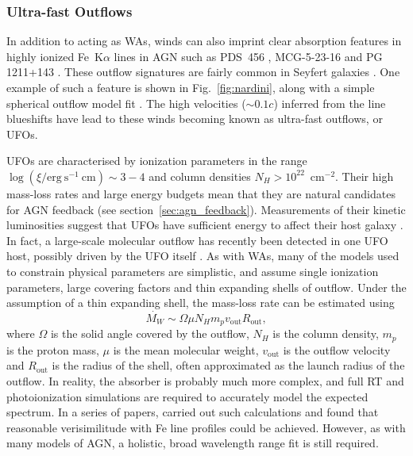 \subsubsection{Ultra-fast Outflows}
\label{sec:ufos}

In addition to acting as WAs, winds can also imprint clear absorption features
in highly ionized Fe~K$\alpha$ lines in AGN such as PDS~456 
\citep{reeves2003, gofford2014,matzeu2016},
MCG-5-23-16 \citep{braito2007} and PG 1211+143 \citep{poundsreeves2009,fukumura2015}.
These outflow signatures are fairly common in Seyfert galaxies \citep{tombesi2010a, gofford2013}. 
One example of such a feature is shown in 
Fig.~\ref{fig:nardini}, along with a simple spherical outflow model fit 
\citep{nardini2015}. The high velocities ($\sim0.1c$) inferred 
from the line blueshifts have lead to these winds becoming known as 
ultra-fast outflows, or UFOs. 

UFOs are characterised by ionization parameters in the range 
$\log (\xi / \mathrm{erg~s^{-1}~cm}) \sim 3-4$
and column densities $N_H > 10^{22}$~cm$^{-2}$. Their high mass-loss rates
and large energy budgets mean that they are natural candidates for
AGN feedback (see section~\ref{sec:agn_feedback}). Measurements of
their kinetic luminosities suggest that UFOs have sufficient 
energy to affect their host galaxy \citep{gofford2015}. In fact, 
a large-scale molecular outflow has recently been detected in one 
UFO host, possibly driven by the UFO itself \citep{tombesi2015}. 
As with WAs, many of the models
used to constrain physical parameters are simplistic, and assume 
single ionization parameters, large covering factors
and thin expanding shells of outflow.
Under the assumption of a thin expanding shell, 
the mass-loss rate can be estimated using
\citep[e.g.][]{borguet2012}
\begin{equation}
\label{eq:hse}
\dot{M_W} \sim \Omega \mu N_H m_p v_{\mathrm{out}} R_{\mathrm{out}},
\end{equation}
where $\Omega$ is the solid angle covered by the outflow, $N_H$
is the column density, $m_p$ is the proton mass, $\mu$ is the mean molecular weight,
$v_{\mathrm{out}}$ is the outflow velocity
and $R_{\mathrm{out}}$ is the radius of the shell, often approximated as the launch radius
of the outflow. In reality, the absorber is probably much more complex, and full 
RT and photoionization simulations are required to accurately model 
the expected spectrum. 
In a series of papers, 
\cite{simlong2008,sim2010_hydro,sim2010_hydro} carried out such calculations
and found that reasonable verisimilitude with Fe line profiles could be achieved.
However, as with many models of AGN, a holistic, broad wavelength range
fit is still required.

